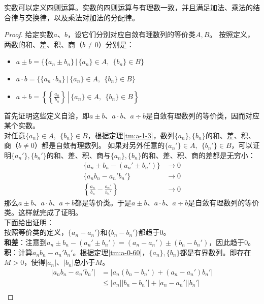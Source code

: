 \documentclass[12pt,UTF8,fontset=none]{ctexbook}
\begin{document}
\begin{appendix}
\begin{tm}\label{tm:a-1-20}
    实数可以定义四则运算。实数的四则运算与有理数一致，并且满足加法、乘法的结合律与交换律，以及乘法对加法的分配律。
\end{tm}
\begin{proof}
    给定实数$a$、$b$，设它们分别对应自敛有理数列的等价类$A,B$。
    按照定义，两数的和、差、积、商（$b\neq 0$）分别是：
    \begin{itemize}
        \item $a \pm b = \{\{a_n \pm b_n\} \, |\, \{a_n\}\in A,\;\,\{b_n\}\in B \}$
        \item $a\cdot b = \{\{a_n \cdot b_n\} \, |\, \{a_n\}\in A,\;\,\{b_n\}\in B \}$
        \item $a\div b = \left.\left\{\left\{\frac{a_n}{b_n}\right\} \, \right|\, \{a_n\}\in A,\;\,\{b_n\}\in B \right\}$
    \end{itemize}
    首先证明这些定义自洽，即$a\pm b$、$a\cdot b$、$a\div b$是自敛有理数列的等价类，因而对应某个实数。\\
    对任意$\{a_n\}\in A,\;\,\{b_n\}\in B$，根据定理\ref{tm:a-1-3}，数列$\{a_n\}, \{b_n\}$的和、差、积、商（$b\neq 0$）都是自敛有理数列。
    如果对另外任意的$\{a_n'\}\in A,\;\,\{b_n'\}\in B$，可以证明$\{a_n'\}, \{b_n'\}$的和、差、积、商与$\{a_n\}, \{b_n\}$的和、差、积、商的差都是无穷小：
    \begin{align*}
        \{a_n \pm b_n - (a_n' \pm b_n')\} &\to 0  \\
        \{a_nb_n - a_n'b_n'\} &\to 0  \\
        \left\{\frac{a_n}{b_n} - \frac{a_n'}{b_n'}\right\} &\to 0  
    \end{align*}
    那么$a\pm b$、$a\cdot b$、$a\div b$都是等价类。于是$a\pm b$、$a\cdot b$、$a\div b$是自敛有理数列的等价类。这样就完成了证明。\\
    下面给出证明：\\
    按照等价类的定义，$\{a_n - a_n'\}$和$\{b_n - b_n'\}$都趋于$0$。\\
    \textbf{和差}：注意到$a_n \pm b_n - (a_n' \pm b_n') = (a_n - a_n') \pm (b_n - b_n')$，因此趋于$0$。\\
    \textbf{积}：计算$a_nb_n - a_n'b_n'$。根据定理\ref{tm:a-0-60}，$\{a_n\}, \{b_n\}$都是有界数列。即存在$M>0$，使得$|a_n|$、$|b_n|$总小于$M$。
    \begin{align*}
        |a_nb_n - a_n'b_n'| &= |a_n(b_n - b_n') + (a_n - a_n')b_n'|  \\
        &\leqslant |a_n||b_n - b_n'| + |a_n - a_n'||b_n'|  \\

\end{align*}
\end{proof}
\end{appendix}
\end{document}
